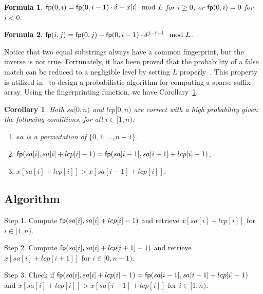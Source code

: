 \documentclass[10pt,journal,compsoc]{IEEEtran}
\newtheorem{Formula}{Formula}
\newtheorem{Corollary}{Corollary}
\begin{document}
	\begin{Formula} \label{formula:1}
		${\sf fp}(0, i) = {\sf fp}(0, i - 1) \cdot {\delta} + x[i]\mod L$ for $i \ge 0$, or ${\sf fp}(0, i) = 0$ for $i < 0$.
		
	\end{Formula}
	
	\begin{Formula} \label{formula:2}
		${\sf fp}(i, j) = {\sf fp}(0, j) - {\sf fp}(0 ,i - 1) \cdot {\delta}^{j - i + 1}\mod L$.
		
	\end{Formula}
	
	Notice that two equal substrings always have a common fingerprint, but the inverse is not true. Fortunately, it has been proved that the probability of a false match can be reduced to a negligible level by setting $L$ properly~\cite{Karp1987}. This property is utilized in~\cite{Bille2013} to design a probabilistic algorithm for computing a sparse suffix array. Using the fingerprinting function, we have Corollary~\ref{corollary:1}.
	
	\begin{Corollary} \label{corollary:1}
		Both $sa[0, n)$ and $lcp[0, n)$ are correct with a high probability given the following conditions, for all $i \in [1, n)$:
		
		\begin{enumerate}[(1)]
			\item
			$sa$ is a permutation of $\{0, 1, \dots, n - 1\}$.
			
			\item
			${\sf fp}(sa[i], sa[i] + lcp[i] - 1) = {\sf fp}(sa[i - 1], sa[i - 1] + lcp[i] - 1)$.
			
			\item
			$x[sa[i] + lcp[i]] > x[sa[i - 1] + lcp[i]]$.
		\end{enumerate}
		
		
		
		
	\end{Corollary}
	
	\subsection{Algorithm} \label{sec:method1:algorithm}
	
	\begin{algorithm*}
		
		\SetAlgoNoLine
		
		
		Step 1. Compute ${\sf fp}(sa[i], sa[i] + lcp[i] - 1)$ and retrieve $x[sa[i] + lcp[i]]$ for $i \in [1, n)$.
		
		Step 2. Compute ${\sf fp}(sa[i], sa[i] + lcp[i + 1] - 1)$ and retrieve $x[sa[i] + lcp[i + 1]]$ for $i \in [0, n - 1)$.
		
		Step 3. Check if ${\sf fp}(sa[i], sa[i] + lcp[i] - 1) = {\sf fp}(sa[i - 1], sa[i - 1] + lcp[i] - 1)$ and $x[sa[i] + lcp[i]] > x[sa[i - 1] + lcp[i]]$ for $i \in [1, n)$.
		
		\caption{The algorithm using Method A.}
		
		\label{alg:1}
		
	\end{algorithm*}
	
\end{document}
